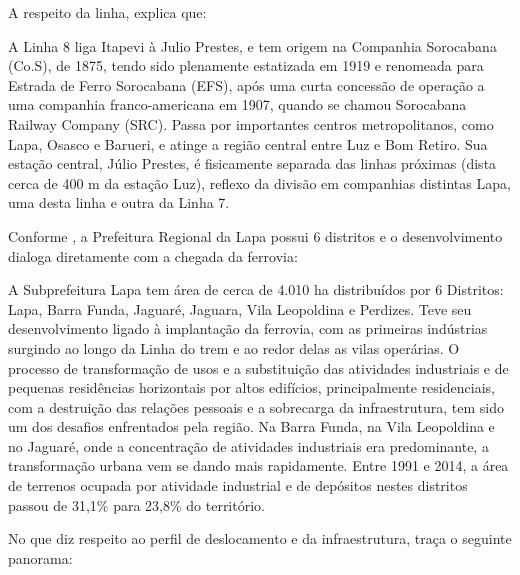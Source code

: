 	A respeito da linha,  explica que:
	
	\begin{citacao}
		A Linha 8 liga Itapevi à Julio Prestes, e tem origem na Companhia Sorocabana (Co.S), de  1875,  tendo  sido  plenamente estatizada  em 1919 e renomeada para Estrada de Ferro Sorocabana (EFS), após uma curta concessão de operação a uma companhia franco-americana em 1907, quando se  chamou  Sorocabana Railway  Company  (SRC).  Passa por importantes centros metropolitanos, como Lapa, Osasco e Barueri, e atinge a região central entre Luz e Bom Retiro. Sua estação central, Júlio Prestes, é fisicamente  separada  das  linhas  próximas (dista cerca de 400 m da estação Luz), reflexo da divisão em companhias distintas Lapa, uma desta linha e outra da Linha 7.
	\end{citacao}
	
	Conforme \cite[pág. 101]{planocentro}, a Prefeitura Regional da Lapa possui 6 distritos e o desenvolvimento dialoga diretamente com a chegada da ferrovia:

	
	\begin{citacao}
		A Subprefeitura Lapa tem área de cerca de 4.010 ha distribuídos por 6 Distritos: Lapa, Barra Funda, Jaguaré, Jaguara, Vila Leopoldina e Perdizes. Teve seu desenvolvimento ligado à implantação da ferrovia, com as primeiras indústrias surgindo ao longo da Linha do trem e ao redor delas as vilas operárias. O processo de transformação de usos e a substituição das atividades industriais e de pequenas residências horizontais por altos edifícios, principalmente residenciais, com a destruição das relações pessoais e a sobrecarga da infraestrutura, tem sido um dos desafios enfrentados pela região. Na Barra Funda, na Vila Leopoldina e no Jaguaré, onde a concentração de atividades industriais era predominante, a transformação urbana vem se dando mais rapidamente. Entre 1991 e 2014, a área de terrenos ocupada por atividade industrial e de depósitos nestes distritos passou de 31,1\% para 23,8\% do território.
	\end{citacao}
	
	No que diz respeito ao perfil de deslocamento e da infraestrutura,  traça o seguinte panorama:
	
